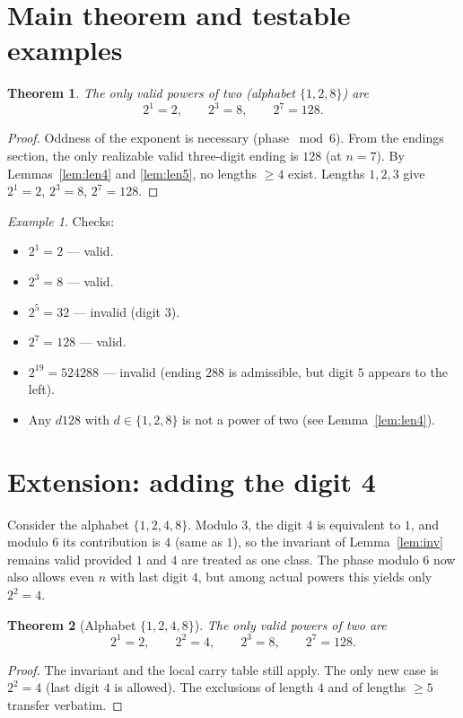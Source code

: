 \documentclass[12pt]{article}
\theoremstyle{plain}
\newtheorem{theorem}{Theorem}
\theoremstyle{remark}
\newtheorem*{example}{Example}
\begin{document}
\section{Main theorem and testable examples}
\begin{theorem}
The only valid powers of two (alphabet $\{1,2,8\}$) are
\[
2^1=2,\qquad 2^3=8,\qquad 2^7=128.
\]
\end{theorem}

\begin{proof}
Oddness of the exponent is necessary (phase $\bmod 6$). From the endings section, the only realizable valid three-digit ending is $128$ (at $n=7$). By Lemmas~\ref{lem:len4} and \ref{lem:len5}, no lengths $\ge4$ exist. Lengths $1,2,3$ give $2^1=2$, $2^3=8$, $2^7=128$.
\end{proof}

\begin{example}
Checks:
\begin{itemize}[nosep]
\item $2^1=2$ — valid.
\item $2^3=8$ — valid.
\item $2^5=32$ — invalid (digit $3$).
\item $2^7=128$ — valid.
\item $2^{19}=524288$ — invalid (ending $288$ is admissible, but digit $5$ appears to the left).
\item Any $d128$ with $d\in\{1,2,8\}$ is not a power of two (see Lemma~\ref{lem:len4}).
\end{itemize}
\end{example}

\section{Extension: adding the digit 4}
Consider the alphabet $\{1,2,4,8\}$. Modulo $3$, the digit $4$ is equivalent to $1$, and modulo $6$ its contribution is $4$ (same as $1$), so the invariant of Lemma~\ref{lem:inv} remains valid provided $1$ and $4$ are treated as one class. The phase modulo $6$ now also allows even $n$ with last digit $4$, but among actual powers this yields only $2^2=4$.

\begin{theorem}[Alphabet $\{1,2,4,8\}$]
The only valid powers of two are
\[
2^1=2,\qquad 2^2=4,\qquad 2^3=8,\qquad 2^7=128.
\]
\end{theorem}

\begin{proof}
The invariant and the local carry table still apply. The only new case is $2^2=4$ (last digit $4$ is allowed). The exclusions of length $4$ and of lengths $\ge5$ transfer verbatim.
\end{proof}
\end{document}
